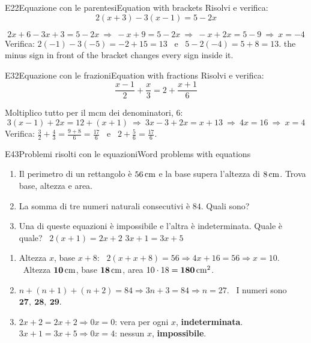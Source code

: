 \begin{esercizio}{E2}{2}{Equazione con le parentesi}{Equation with brackets}
Risolvi e verifica: 
\[2(x+3)-3(x-1)=5-2x\]
\end{esercizio}
\begin{solbox}
\[2x+6-3x+3=5-2x\ \Rightarrow\ -x+9=5-2x\ \Rightarrow\ -x+2x=5-9\ \Rightarrow\ \boxed{x=-4}\]
Verifica: $2(-1)-3(-5)=-2+15=13$ \ e \ $5-2(-4)=5+8=13$. \checkmark
{}
{the minus sign in front of the bracket changes every sign inside it.}
\end{solbox}

\begin{esercizio}{E3}{2}{Equazione con le frazioni}{Equation with fractions}
Risolvi e verifica: 
\[\frac{x-1}{2}+\frac{x}{3}=2+\frac{x+1}{6}\]
\end{esercizio}
\begin{solbox}
Moltiplico tutto per il mcm dei denominatori, $6$: 
\[3(x-1)+2x=12+(x+1)\ \Rightarrow\ 3x-3+2x=x+13\ \Rightarrow\ 4x=16\ \Rightarrow\ \boxed{x=4}\]
Verifica: $\frac32+\frac43=\frac{9+8}{6}=\frac{17}{6}$ \ e \ $2+\frac56=\frac{17}{6}$. \checkmark
{}
\end{solbox}

\begin{esercizio}{E4}{3}{Problemi risolti con le equazioni}{Word problems with equations}
\begin{enumerate}
\item Il perimetro di un rettangolo è $56\,\mathrm{cm}$ e la base supera l'altezza di $8\,\mathrm{cm}$. Trova base, altezza e area.
\item La somma di tre numeri naturali consecutivi è $84$. Quali sono?
\item Una di queste equazioni è impossibile e l'altra è indeterminata. Quale è quale? \ $2(x+1)=2x+2$ \quad $3x+1=3x+5$
\end{enumerate}
\end{esercizio}
\begin{solbox}
\begin{enumerate}
\item Altezza $x$, base $x+8$: \ $2(x+x+8)=56\Rightarrow 4x+16=56\Rightarrow x=10$. \ Altezza $\mathbf{10\,\mathrm{cm}}$, base $\mathbf{18\,\mathrm{cm}}$, area $10\cdot18=\mathbf{180\,\mathrm{cm^2}}$.
\item $n+(n+1)+(n+2)=84\Rightarrow 3n+3=84\Rightarrow n=27$. \ I numeri sono $\mathbf{27,\ 28,\ 29}$.
\item $2x+2=2x+2\Rightarrow 0x=0$: vera per ogni $x$, \textbf{indeterminata}. \quad $3x+1=3x+5\Rightarrow 0x=4$: nessun $x$, \textbf{impossibile}.
\end{enumerate}
\end{solbox}


